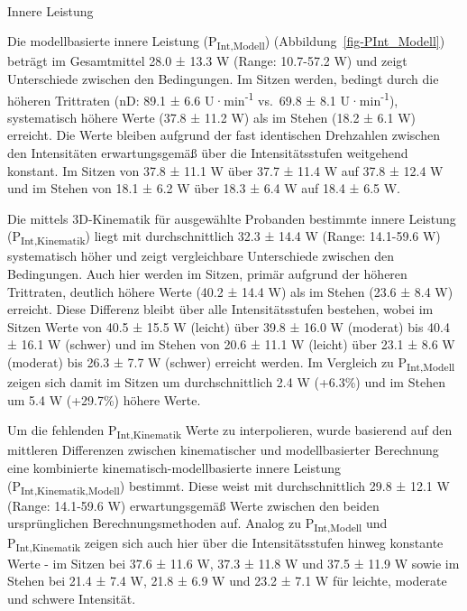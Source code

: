 \documentclass[
  letterpaper,
  DIV=11]{scrartcl}
\makeatletter
\let\oldparagraph\paragraph
\renewcommand{\paragraph}{
    \@ifstar
      \xxxParagraphStar
      \xxxParagraphNoStar
  }
\newcommand{\xxxParagraphStar}[1]{\oldparagraph*{#1}\mbox{}}
\newcommand{\xxxParagraphNoStar}[1]{\oldparagraph{#1}\mbox{}}
\makeatother
\begin{document}
\paragraph{Innere Leistung}\label{innere-leistung}

Die modellbasierte innere Leistung (P\textsubscript{Int,Modell})
(Abbildung~\ref{fig-PInt_Modell}) beträgt im Gesamtmittel 28.0 ± 13.3 W
(Range: 10.7-57.2 W) und zeigt Unterschiede zwischen den Bedingungen. Im
Sitzen werden, bedingt durch die höheren Trittraten (nD: 89.1 ± 6.6
U·min\textsuperscript{-1} vs.~69.8 ± 8.1 U·min\textsuperscript{-1}),
systematisch höhere Werte (37.8 ± 11.2 W) als im Stehen (18.2 ± 6.1 W)
erreicht. Die Werte bleiben aufgrund der fast identischen Drehzahlen
zwischen den Intensitäten erwartungsgemäß über die Intensitätsstufen
weitgehend konstant. Im Sitzen von 37.8 ± 11.1 W über 37.7 ± 11.4 W auf
37.8 ± 12.4 W und im Stehen von 18.1 ± 6.2 W über 18.3 ± 6.4 W auf 18.4
± 6.5 W.

Die mittels 3D-Kinematik für ausgewählte Probanden bestimmte innere
Leistung (P\textsubscript{Int,Kinematik}) liegt mit durchschnittlich
32.3 ± 14.4 W (Range: 14.1-59.6 W) systematisch höher und zeigt
vergleichbare Unterschiede zwischen den Bedingungen. Auch hier werden im
Sitzen, primär aufgrund der höheren Trittraten, deutlich höhere Werte
(40.2 ± 14.4 W) als im Stehen (23.6 ± 8.4 W) erreicht. Diese Differenz
bleibt über alle Intensitätsstufen bestehen, wobei im Sitzen Werte von
40.5 ± 15.5 W (leicht) über 39.8 ± 16.0 W (moderat) bis 40.4 ± 16.1 W
(schwer) und im Stehen von 20.6 ± 11.1 W (leicht) über 23.1 ± 8.6 W
(moderat) bis 26.3 ± 7.7 W (schwer) erreicht werden. Im Vergleich zu
P\textsubscript{Int,Modell} zeigen sich damit im Sitzen um
durchschnittlich 2.4 W (+6.3\%) und im Stehen um 5.4 W (+29.7\%) höhere
Werte.

Um die fehlenden P\textsubscript{Int,Kinematik} Werte zu interpolieren,
wurde basierend auf den mittleren Differenzen zwischen kinematischer und
modellbasierter Berechnung eine kombinierte kinematisch-modellbasierte
innere Leistung (P\textsubscript{Int,Kinematik,Modell}) bestimmt. Diese
weist mit durchschnittlich 29.8 ± 12.1 W (Range: 14.1-59.6 W)
erwartungsgemäß Werte zwischen den beiden ursprünglichen
Berechnungsmethoden auf. Analog zu P\textsubscript{Int,Modell} und
P\textsubscript{Int,Kinematik} zeigen sich auch hier über die
Intensitätsstufen hinweg konstante Werte - im Sitzen bei 37.6 ± 11.6 W,
37.3 ± 11.8 W und 37.5 ± 11.9 W sowie im Stehen bei 21.4 ± 7.4 W, 21.8 ±
6.9 W und 23.2 ± 7.1 W für leichte, moderate und schwere Intensität.
\end{document}
